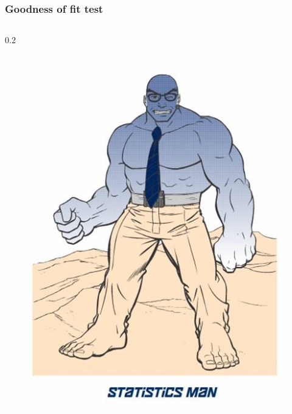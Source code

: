 \documentclass[aspectratio=169]{beamer}
\begin{document}
\begin{frame}
  \frametitle{Goodness of fit test}
  \begin{columns}
    \begin{column} {0.2 \textwidth}

    \begin{figure}
      \centering
        \includegraphics[width=\textwidth]{img/les6-man.jpg}
    \end{figure}

    \end{column}


\end{columns}
\end{frame}
\end{document}
